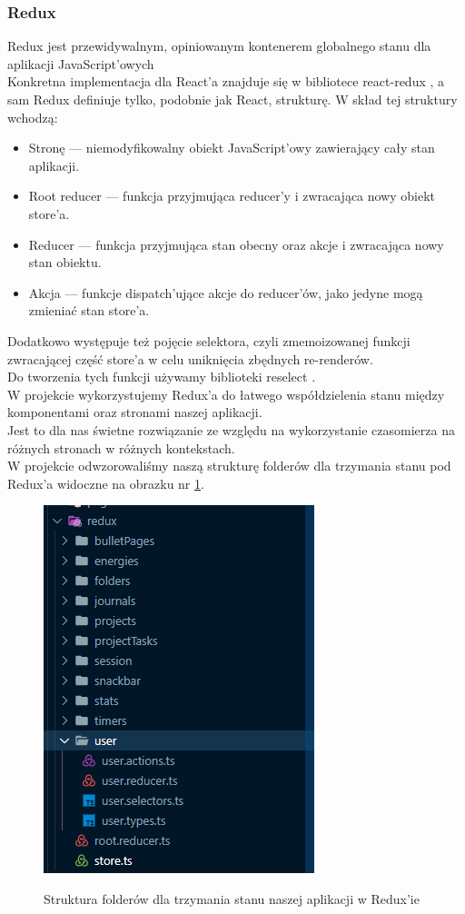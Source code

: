 \documentclass[a4paper,11pt]{report}
\begin{document}
\subsubsection{Redux}
\label{subsec:redux}
Redux\cite{redux} jest przewidywalnym, opiniowanym kontenerem globalnego stanu dla aplikacji JavaScript'owych\\
Konkretna implementacja dla React'a znajduje się w bibliotece react-redux \cite{react-redux},
 a sam Redux definiuje tylko, podobnie jak React, strukturę.
W skład tej struktury wchodzą:
\begin{itemize}
	\item Stronę — niemodyfikowalny obiekt JavaScript'owy zawierający cały stan aplikacji.
	\item Root reducer — funkcja przyjmująca reducer'y i zwracająca nowy obiekt store'a.
	\item Reducer — funkcja przyjmująca stan obecny oraz akcje i zwracająca nowy stan obiektu.
	\item Akcja — funkcje dispatch'ujące akcje do reducer'ów, jako jedyne mogą zmieniać stan store'a.
\end{itemize}
Dodatkowo występuje też pojęcie selektora, czyli zmemoizowanej funkcji zwracającej część store'a w celu uniknięcia zbędnych re-renderów.\\
Do tworzenia tych funkcji używamy biblioteki reselect \cite{reselect}.\\
W projekcie wykorzystujemy Redux'a do łatwego współdzielenia stanu między komponentami oraz stronami naszej aplikacji.\\
Jest to dla nas świetne rozwiązanie ze względu na wykorzystanie czasomierza na różnych stronach w różnych kontekstach.\\
W projekcie odwzorowaliśmy naszą strukturę folderów dla trzymania stanu pod Redux'a widoczne na obrazku nr \ref{fig:struktura_redux}.
\begin{figure}[H]
	\centering
	\includegraphics[scale=0.5]{implementacja/frontend/struktura_redux}\\
	\caption{Struktura folderów dla trzymania stanu naszej aplikacji w Redux'ie}
	\label{fig:struktura_redux}
\end{figure}
\end{document}
